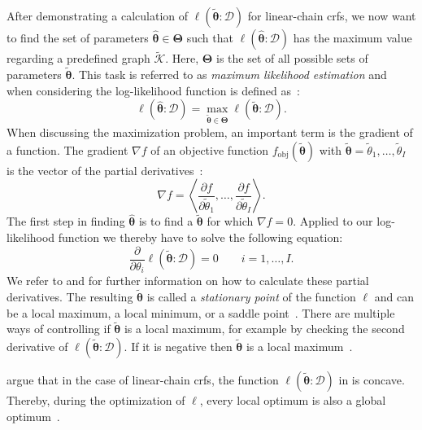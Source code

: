 After demonstrating a calculation of $\ell(\bm{\tilde{\theta}}:\mathcal{D})$ for \glspl{linear-chain crf}, we now want to find the set of parameters $\bm{\hat{\theta}}\in\mathbf{\Theta}$ such that $\ell(\bm{\hat{\theta}}:\mathcal{D})$ has the maximum value regarding a predefined graph $\mathcal{\tilde{K}}$.
Here, $\bm{\Theta}$ is the set of all possible sets of parameters $\bm{\tilde{\theta}}$.
This task is referred to as \textit{maximum likelihood estimation} and when considering the log-likelihood function is defined as~\citep{koller2009probabilistic}:
\begin{equation}
  \label{equ:maximum-log-likelihood-estimation}
  \ell\left(\bm{\hat{\theta}}:\mathcal{D}\right)=\max_{\bm{\tilde{\theta}}\in\mathbf{\Theta}}\ell\left(\bm{\tilde{\theta}}:\mathcal{D}\right).
\end{equation}
When discussing the maximization problem, an important term is the \gls{gradient} of a \gls{function}.
The \gls{gradient} $\nabla f$ of an \gls{objective function} $f_{\text{obj}}(\bm{\tilde{\theta}})$ with $\bm{\tilde{\theta}}=\tilde{\theta}_1,\dots,\tilde{\theta}_I$ is the vector of the partial derivatives~\citep{koller2009probabilistic}:
\begin{equation}
  \label{equ:gradient}
  \nabla f=\left\langle\frac{\partial f}{\partial\tilde{\theta}_1},\dots,\frac{\partial f}{\partial\tilde{\theta}_I}\right\rangle.
\end{equation}
The first step in finding $\bm{\hat{\theta}}$ is to find a $\bm{\tilde{\theta}}$ for which $\nabla f=0$.
Applied to our log-likelihood function we thereby have to solve the following equation:
\begin{equation}
  \label{equ:log-likelihood-gradient}
  \frac{\partial}{\partial\theta_i}\ell\left(\bm{\tilde{\theta}}:\mathcal{D}\right)=0\ \ \ \ \ \ \ \ \ i=1,\dots,I.
\end{equation}
We refer to \citet{sutton2010introduction} and \citet{koller2009probabilistic} for further information on how to calculate these partial derivatives.
The resulting $\bm{\tilde{\theta}}$ is called a \textit{stationary point} of the function $\ell$ and can be a local maximum, a local minimum, or a saddle point~\citep{koller2009probabilistic}.
There are multiple ways of controlling if $\bm{\tilde{\theta}}$ is a local maximum, for example by checking the second derivative of $\ell(\bm{\tilde{\theta}}:\mathcal{D})$.
If it is negative then $\bm{\tilde{\theta}}$ is a local maximum~\citep{koller2009probabilistic}.

\citet{sutton2010introduction} argue that in the case of \glspl{linear-chain crf}, the function $\ell(\bm{\tilde{\theta}}:\mathcal{D})$ in  is concave.
Thereby, during the optimization of $\ell$, every local optimum is also a global optimum~\citep{sutton2010introduction}.

